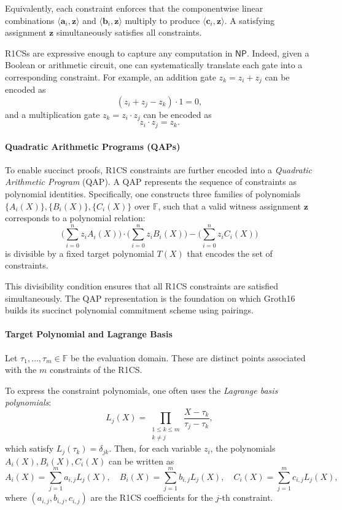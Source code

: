 Equivalently, each constraint enforces that the componentwise linear combinations 
$\langle \mathbf{a}_i, \mathbf{z} \rangle$ and $\langle \mathbf{b}_i, \mathbf{z} \rangle$ multiply to produce 
$\langle \mathbf{c}_i, \mathbf{z} \rangle$.  
A satisfying assignment $\mathbf{z}$ simultaneously satisfies all constraints.

R1CSs are expressive enough to capture any computation in $\mathsf{NP}$.  
Indeed, given a Boolean or arithmetic circuit, one can systematically translate each gate into a corresponding constraint.  
For example, an addition gate $z_k = z_i + z_j$ can be encoded as
\[
(z_i + z_j - z_k) \cdot 1 = 0,
\]
and a multiplication gate $z_k = z_i \cdot z_j$ can be encoded as
\[
z_i \cdot z_j = z_k.
\]

\paragraph{Quadratic Arithmetic Programs (QAPs)}
To enable succinct proofs, R1CS constraints are further encoded into a \emph{Quadratic Arithmetic Program} (QAP).  
A QAP represents the sequence of constraints as polynomial identities. Specifically,  
one constructs three families of polynomials $\{A_i(X)\}, \{B_i(X)\}, \{C_i(X)\}$ over $\mathbb{F}$,  
such that a valid witness assignment $\mathbf{z}$ corresponds to a polynomial relation:
\[
\Big(\sum_{i=0}^{n} z_i A_i(X)\Big) \cdot 
\Big(\sum_{i=0}^{n} z_i B_i(X)\Big) - 
\Big(\sum_{i=0}^{n} z_i C_i(X)\Big)
\]
is divisible by a fixed target polynomial $T(X)$ that encodes the set of constraints.  

This divisibility condition ensures that all R1CS constraints are satisfied simultaneously.  
The QAP representation is the foundation on which Groth16 builds its succinct polynomial commitment scheme using pairings.

\paragraph{Target Polynomial and Lagrange Basis}
Let $\tau_1, \dots, \tau_m \in \mathbb{F}$ be the evaluation domain. These are distinct points associated with the $m$ constraints of the R1CS.

\noindent To express the constraint polynomials, one often uses the \emph{Lagrange basis polynomials}:
\[
L_j(X) = \prod_{\substack{1 \leq k \leq m \\ k \neq j}} \frac{X - \tau_k}{\tau_j - \tau_k},
\]
which satisfy $L_j(\tau_k) = \delta_{jk}$.  
Then, for each variable $z_i$, the polynomials $A_i(X), B_i(X), C_i(X)$ can be written as
\[
A_i(X) = \sum_{j=1}^{m} a_{i,j} L_j(X), \quad 
B_i(X) = \sum_{j=1}^{m} b_{i,j} L_j(X), \quad 
C_i(X) = \sum_{j=1}^{m} c_{i,j} L_j(X),
\]
where $(a_{i,j}, b_{i,j}, c_{i,j})$ are the R1CS coefficients for the $j$-th constraint.  

